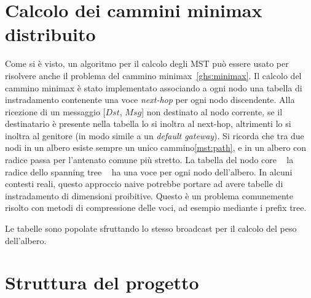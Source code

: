 \documentclass[target=bach,aauheader=,style=]{thud}
\newcommand{\eng}[1]{\foreignlanguage{english}{#1}}
\begin{document}
\section{Calcolo dei cammini minimax distribuito}

Come si è visto, un algoritmo per il calcolo degli MST può essere usato per risolvere anche il problema del cammino minimax~\ref{ghs:minimax}. Il calcolo del cammino minimax è stato implementato associando a ogni nodo una tabella di instradamento contenente una voce \eng{\emph{next-hop}} per ogni nodo discendente. Alla ricezione di un messaggio [$Dst$, $Msg$] non destinato al nodo corrente, se il destinatario è presente nella tabella lo si inoltra al \eng{next-hop}, altrimenti lo si inoltra al genitore (in modo simile a un \eng{\emph{default gateway}}). Si ricorda che tra due nodi in un albero esiste sempre un unico cammino\ref{mst:path}, e in un albero con radice passa per l'antenato comune più stretto. La tabella del nodo core \,\textendash\,~la radice dello \eng{spanning tree}~\,\textendash\, ha una voce per ogni nodo dell'albero. In alcuni contesti reali, questo approccio \eng{naive} potrebbe portare ad avere tabelle di instradamento di dimensioni proibitive. Questo è un problema comunemente risolto con metodi di compressione delle voci, ad esempio mediante i \eng{prefix tree}.

Le tabelle sono popolate sfruttando lo stesso \eng{broadcast} per il calcolo del peso dell'albero.

\section{Struttura del progetto}
\end{document}
